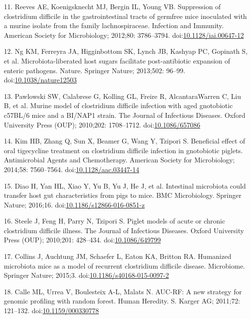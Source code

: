 \documentclass[11pt,]{article}
\begin{document}
11. Reeves AE, Koenigsknecht MJ, Bergin IL, Young VB. Suppression of
clostridium difficile in the gastrointestinal tracts of germfree mice
inoculated with a murine isolate from the family lachnospiraceae.
Infection and Immunity. American Society for Microbiology; 2012;80:
3786--3794.
doi:\href{http://dx.doi.org/10.1128/iai.00647-12}{10.1128/iai.00647-12}

12. Ng KM, Ferreyra JA, Higginbottom SK, Lynch JB, Kashyap PC, Gopinath
S, et al. Microbiota-liberated host sugars facilitate post-antibiotic
expansion of enteric pathogens. Nature. Springer Nature; 2013;502:
96--99.
doi:\href{http://dx.doi.org/10.1038/nature12503}{10.1038/nature12503}

13. Pawlowski SW, Calabrese G, Kolling GL, Freire R, AlcantaraWarren C,
Liu B, et al. Murine model of clostridium difficile infection with aged
gnotobiotic c57BL/6 mice and a BI/NAP1 strain. The Journal of Infectious
Diseases. Oxford University Press (OUP); 2010;202: 1708--1712.
doi:\href{http://dx.doi.org/10.1086/657086}{10.1086/657086}

14. Kim HB, Zhang Q, Sun X, Beamer G, Wang Y, Tzipori S. Beneficial
effect of oral tigecycline treatment on clostridium difficile infection
in gnotobiotic piglets. Antimicrobial Agents and Chemotherapy. American
Society for Microbiology; 2014;58: 7560--7564.
doi:\href{http://dx.doi.org/10.1128/aac.03447-14}{10.1128/aac.03447-14}

15. Diao H, Yan HL, Xiao Y, Yu B, Yu J, He J, et al. Intestinal
microbiota could transfer host gut characteristics from pigs to mice.
BMC Microbiology. Springer Nature; 2016;16.
doi:\href{http://dx.doi.org/10.1186/s12866-016-0851-z}{10.1186/s12866-016-0851-z}

16. Steele J, Feng H, Parry N, Tzipori S. Piglet models of acute or
chronic clostridium difficile illness. The Journal of Infectious
Diseases. Oxford University Press (OUP); 2010;201: 428--434.
doi:\href{http://dx.doi.org/10.1086/649799}{10.1086/649799}

17. Collins J, Auchtung JM, Schaefer L, Eaton KA, Britton RA. Humanized
microbiota mice as a model of recurrent clostridium difficile disease.
Microbiome. Springer Nature; 2015;3.
doi:\href{http://dx.doi.org/10.1186/s40168-015-0097-2}{10.1186/s40168-015-0097-2}

18. Calle ML, Urrea V, Boulesteix A-L, Malats N. AUC-RF: A new strategy
for genomic profiling with random forest. Human Heredity. S. Karger AG;
2011;72: 121--132.
doi:\href{http://dx.doi.org/10.1159/000330778}{10.1159/000330778}
\end{document}
